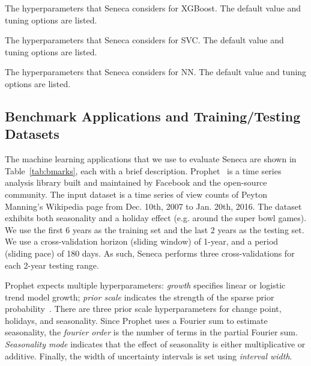 \begin{table}[t]
\centering
\scriptsize

\caption{The hyperparameters that Seneca considers for XGBoost. 
The default value and tuning options are listed. 
\label{tab:xgboost_para}}
\end{table}

\begin{table}[t]
\centering
\scriptsize

\caption{The hyperparameters that Seneca considers for SVC. 
The default value and tuning options are listed. 
\label{tab:svc_para}}
\end{table}

\begin{table}[t]
\centering
\scriptsize

\caption{The hyperparameters that Seneca considers for NN.
The default value and tuning options are listed. 
\label{tab:nn_para}}
\vspace{-0.2in}
\end{table}


\subsection{Benchmark Applications and Training/Testing  Datasets}
The machine learning applications that we use to evaluate Seneca 
are shown in Table~\ref{tab:bmarks}, each with 
a brief description.
Prophet~\cite{ref:prophet} is a time series analysis library built and maintained by Facebook and the open-source community. The input dataset is a time series of view counts
of Peyton Manning's Wikipedia page from Dec. 10th, 2007 to Jan. 20th, 2016. 
The dataset exhibits both seasonality and a holiday effect (e.g. around the super bowl games). 
We use the first 6 years as the training set and the last 2 years as the testing set.
We use a cross-validation horizon (sliding window) of 1-year, 
and a period (sliding pace) 
of 180 days.  As such, Seneca performs three cross-validations for each 2-year testing range.

Prophet expects multiple hyperparameters: \textit{growth} specifies linear or logistic trend model growth; \textit{prior scale} indicates the strength of the 
sparse prior probability~\cite{ref:sparse_prior}. 
There are three prior scale hyperparameters for change point, holidays, and seasonality. 
Since Prophet uses a Fourier sum to estimate seasonality, 
the \textit{fourier order} is the number of terms in the partial Fourier 
sum. \textit{Seasonality mode} indicates that the effect of seasonality is either 
multiplicative or additive. Finally, the width of uncertainty intervals 
is set using \textit{interval width}.

